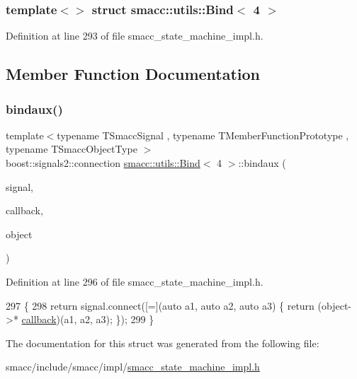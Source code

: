 \subsubsection*{template$<$$>$\newline
struct smacc\+::utils\+::\+Bind$<$ 4 $>$}



Definition at line 293 of file smacc\+\_\+state\+\_\+machine\+\_\+impl.\+h.



\subsection{Member Function Documentation}
\mbox{\label{structsmacc_1_1utils_1_1Bind_3_014_01_4_af999b2ea156fad369be761be47f83f18}} 
\subsubsection{\texorpdfstring{bindaux()}{bindaux()}}
{\footnotesize\ttfamily template$<$typename T\+Smacc\+Signal , typename T\+Member\+Function\+Prototype , typename T\+Smacc\+Object\+Type $>$ \\
boost\+::signals2\+::connection \hyperlink{structsmacc_1_1utils_1_1Bind}{smacc\+::utils\+::\+Bind}$<$ 4 $>$\+::bindaux (\begin{DoxyParamCaption}\item[{T\+Smacc\+Signal \&}]{signal,  }\item[{T\+Member\+Function\+Prototype}]{callback,  }\item[{T\+Smacc\+Object\+Type $\ast$}]{object }\end{DoxyParamCaption})\hspace{0.3cm}{\ttfamily [inline]}}



Definition at line 296 of file smacc\+\_\+state\+\_\+machine\+\_\+impl.\+h.


\begin{DoxyCode}
297       \{
298         \textcolor{keywordflow}{return} signal.connect([=](\textcolor{keyword}{auto} a1, \textcolor{keyword}{auto} a2, \textcolor{keyword}{auto} a3) \{ \textcolor{keywordflow}{return} (object->*
      \hyperlink{sm__ridgeback__barrel__search__1_2servers_2opencv__perception__node_2opencv__perception__node_8cpp_a050e697bd654facce10ea3f6549669b3}{callback})(a1, a2, a3); \});
299       \}
\end{DoxyCode}


The documentation for this struct was generated from the following file\+:\begin{DoxyCompactItemize}
\item 
smacc/include/smacc/impl/\hyperlink{smacc__state__machine__impl_8h}{smacc\+\_\+state\+\_\+machine\+\_\+impl.\+h}\end{DoxyCompactItemize}
